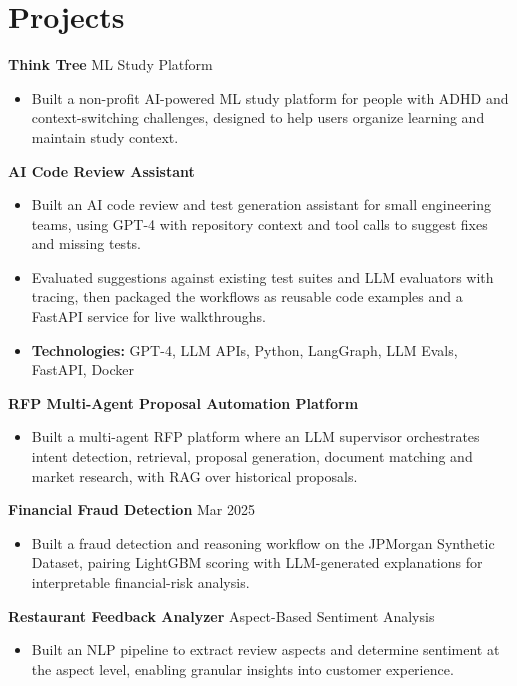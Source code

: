 \documentclass[10pt,a4paper]{article}
\begin{document}
\section{Projects}
\textbf{Think Tree} \textbar{} ML Study Platform\par
\begin{itemize}
  \item Built a non-profit AI-powered ML study platform for people with ADHD and context-switching challenges, designed to help users organize learning and maintain study context.
\end{itemize}
\textbf{AI Code Review Assistant}\par
\begin{itemize}
  \item Built an AI code review and test generation assistant for small engineering teams, using GPT-4 with repository context and tool calls to suggest fixes and missing tests.
  \item Evaluated suggestions against existing test suites and LLM evaluators with tracing, then packaged the workflows as reusable code examples and a FastAPI service for live walkthroughs.
  \item \textbf{Technologies:} GPT-4, LLM APIs, Python, LangGraph, LLM Evals, FastAPI, Docker
\end{itemize}
\textbf{RFP Multi-Agent Proposal Automation Platform}\par
\begin{itemize}
  \item Built a multi-agent RFP platform where an LLM supervisor orchestrates intent detection, retrieval, proposal generation, document matching and market research, with RAG over historical proposals.
\end{itemize}
\textbf{Financial Fraud Detection} \textbar{} Mar 2025\par
\begin{itemize}
  \item Built a fraud detection and reasoning workflow on the JPMorgan Synthetic Dataset, pairing LightGBM scoring with LLM-generated explanations for interpretable financial-risk analysis.
\end{itemize}
\textbf{Restaurant Feedback Analyzer} \textbar{} Aspect-Based Sentiment Analysis\par
\begin{itemize}
  \item Built an NLP pipeline to extract review aspects and determine sentiment at the aspect level, enabling granular insights into customer experience.
\end{itemize}
\end{document}
